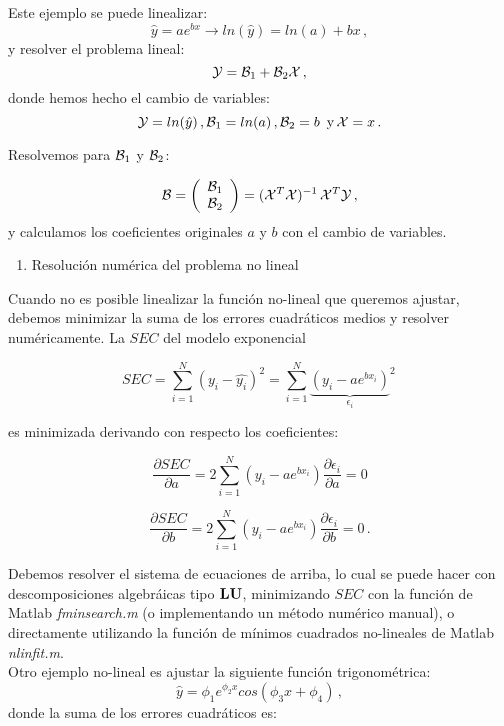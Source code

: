 \documentclass[
]{agujournal2019}
\providecommand{\tightlist}{%
  \setlength{\itemsep}{0pt}\setlength{\parskip}{0pt}}\usepackage{longtable,booktabs,array}
\begin{document}
Este ejemplo se puede linealizar:
\[\hat{y}=a e^{bx}\rightarrow ln(\hat{y})=ln(a) + bx\,,\] y resolver el
problema lineal: \[{\cal Y}={\cal B}_1 + {\cal B}_2 {\cal X}\,,\] donde
hemos hecho el cambio de variables:
\[{\cal Y}=ln(\hat{y})\,,{\cal B}_1=ln(a)\,,{\cal B}_2=b\,\,\,{\rm y}\,{\cal X}=x\,.\]

Resolvemos para \({\cal B}_1\) y \({\cal B}_2\):

\[{\cal B}=\left(\begin{array}{c}
            {\cal B}_1\\
            {\cal B}_2\\
              \end{array}\right)=({\cal X}^T {\cal X})^{-1}\,{\cal X}^T{\cal Y}
\,,\] y calculamos los coeficientes originales \(a\) y \(b\) con el
cambio de variables.

\vspace{0.5cm}

\begin{enumerate}
\def\labelenumi{\arabic{enumi}.}
\setcounter{enumi}{1}
\tightlist
\item
  Resolución numérica del problema no lineal\\
\end{enumerate}

Cuando no es posible linealizar la función no-lineal que queremos
ajustar, debemos minimizar la suma de los errores cuadráticos medios y
resolver numéricamente. La \(SEC\) del modelo exponencial

\[SEC=\sum\limits^N_{i=1}(y_i-\hat{y_i})^2=\sum\limits^N_{i=1}
              {\underbrace{\left(y_i - a e^{bx_i}\right)}_{\epsilon_i}}^2\,\]

es minimizada derivando con respecto los coeficientes:

\[\frac{\partial{SEC}}{\partial{a}}=
      2\sum\limits^N_{i=1}\left(y_i - a e^{bx_i}\right)\frac{\partial{\epsilon_i}}{\partial{a}}=0\]

\[\frac{\partial{SEC}}{\partial{b}}=
2\sum\limits^N_{i=1}\left(y_i - a e^{bx_i}\right)\frac{\partial{\epsilon_i}}{\partial{b}}=0\,.\]

Debemos resolver el sistema de ecuaciones de arriba, lo cual se puede
hacer con descomposiciones algebráicas tipo \({\textbf L}{\textbf U}\),
minimizando \(SEC\) con la función de Matlab \emph{fminsearch.m} (o
implementando un método numérico manual), o directamente utilizando la
función de mínimos cuadrados no-lineales de Matlab \emph{nlinfit.m}.\\
Otro ejemplo no-lineal es ajustar la siguiente función trigonométrica:
\[\hat{y}=\phi_1 e^{\phi_2 x} cos(\phi_3 x + \phi_4)\,,\] donde la suma
de los errores cuadráticos es:
\end{document}
